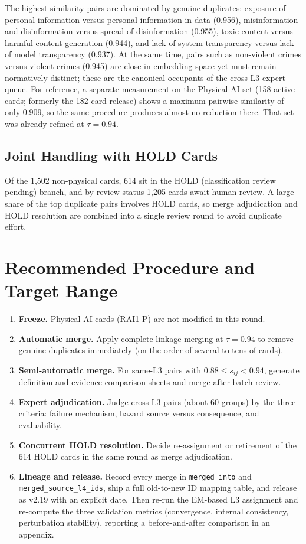 \documentclass[11pt,a4paper]{article}
\begin{document}
The highest-similarity pairs are dominated by genuine duplicates: exposure of personal information versus personal information in data (0.956), misinformation and disinformation versus spread of disinformation (0.955), toxic content versus harmful content generation (0.944), and lack of system transparency versus lack of model transparency (0.937). At the same time, pairs such as non-violent crimes versus violent crimes (0.945) are close in embedding space yet must remain normatively distinct; these are the canonical occupants of the cross-L3 expert queue. For reference, a separate measurement on the Physical AI set (158 active cards; formerly the 182-card release) shows a maximum pairwise similarity of only 0.909, so the same procedure produces almost no reduction there. That set was already refined at $\tau=0.94$.

\subsection{Joint Handling with HOLD Cards}

Of the 1{,}502 non-physical cards, 614 sit in the HOLD (classification review pending) branch, and by review status 1{,}205 cards await human review. A large share of the top duplicate pairs involves HOLD cards, so merge adjudication and HOLD resolution are combined into a single review round to avoid duplicate effort.

\section{Recommended Procedure and Target Range}

\begin{enumerate}
\item \textbf{Freeze.} Physical AI cards (RAI1-P) are not modified in this round.
\item \textbf{Automatic merge.} Apply complete-linkage merging at $\tau=0.94$ to remove genuine duplicates immediately (on the order of several to tens of cards).
\item \textbf{Semi-automatic merge.} For same-L3 pairs with $0.88 \leq s_{ij} < 0.94$, generate definition and evidence comparison sheets and merge after batch review.
\item \textbf{Expert adjudication.} Judge cross-L3 pairs (about 60 groups) by the three criteria: failure mechanism, hazard source versus consequence, and evaluability.
\item \textbf{Concurrent HOLD resolution.} Decide re-assignment or retirement of the 614 HOLD cards in the same round as merge adjudication.
\item \textbf{Lineage and release.} Record every merge in \texttt{merged\_into} and \texttt{merged\_source\_l4\_ids}, ship a full old-to-new ID mapping table, and release as v2.19 with an explicit date. Then re-run the EM-based L3 assignment and re-compute the three validation metrics (convergence, internal consistency, perturbation stability), reporting a before-and-after comparison in an appendix.
\end{enumerate}
\end{document}
